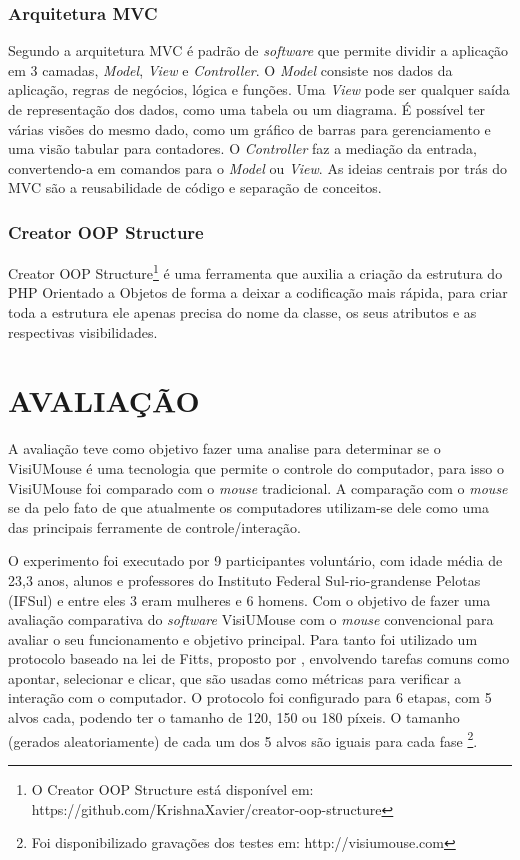 \subsection{Arquitetura MVC}

Segundo  a arquitetura MVC é padrão de \textit{software} que permite dividir a aplicação em 3 camadas, \textit{Model}, \textit{View} e \textit{Controller}. O \textit{Model} consiste nos dados da aplicação, regras de negócios, lógica e funções. Uma \textit{View} pode ser qualquer saída de representação dos dados, como uma tabela ou um diagrama. É possível ter várias visões do mesmo dado, como um gráfico de barras para gerenciamento e uma visão tabular para contadores. O \textit{Controller} faz a mediação da entrada, convertendo-a em comandos para o \textit{Model} ou \textit{View}. As ideias centrais por trás do MVC são a reusabilidade de código e separação de conceitos.

\subsection{Creator OOP Structure}

Creator OOP Structure\footnote{O Creator OOP Structure está disponível em: https://github.com/KrishnaXavier/creator-oop-structure}  é uma ferramenta que auxilia a criação da estrutura do PHP Orientado a Objetos de forma a deixar a codificação mais rápida, para criar toda a estrutura ele apenas precisa do nome da classe, os seus atributos e as respectivas visibilidades.


\chapter{AVALIAÇÃO}\label{CAP7}
A avaliação teve como objetivo fazer uma analise para determinar se o VisiUMouse é uma tecnologia que permite o controle do computador, para isso o VisiUMouse foi comparado com o \textit{mouse} tradicional. A comparação com o \textit{mouse} se da pelo fato de que atualmente os computadores utilizam-se dele como uma das principais ferramente de controle/interação.

O experimento foi executado por 9 participantes voluntário, com idade média de 23,3 anos, alunos e professores do Instituto Federal Sul-rio-grandense Pelotas (IFSul) e entre eles 3 eram mulheres e 6 homens. Com o objetivo de fazer uma avaliação comparativa do \textit{software} VisiUMouse com o \textit{mouse} convencional para avaliar o seu funcionamento e objetivo principal. Para tanto foi utilizado um protocolo baseado na lei de Fitts, proposto por , envolvendo tarefas comuns como apontar, selecionar e clicar, que são usadas como métricas para verificar a interação com o computador. O protocolo foi configurado para 6 etapas, com 5 alvos cada, podendo ter o tamanho de 120, 150 ou 180 píxeis. O tamanho (gerados aleatoriamente) de cada um dos 5 alvos são iguais para cada fase \footnote{Foi disponibilizado gravações dos testes em: http://visiumouse.com}.

